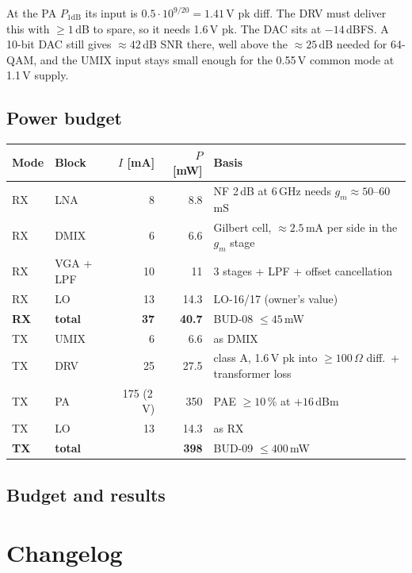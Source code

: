 \medskip
\noindent At the PA $P_\mathrm{1dB}$ its input is $0.5 \cdot 10^{9/20} = 1.41$\,V pk diff.
The DRV must deliver this with $\geq 1$\,dB to spare, so it needs 1.6\,V pk. The DAC sits
at $-14$\,dBFS. A 10-bit DAC still gives $\approx 42$\,dB SNR there, well above the
$\approx 25$\,dB needed for 64-QAM, and the UMIX input stays small enough for the
0.55\,V common mode at 1.1\,V supply.

\subsection{Power budget}

\par\medskip\noindent\small
\begin{tabularx}{\textwidth}{@{}l l r r L@{}}
	\toprule
	\textbf{Mode} & \textbf{Block} & \textbf{$I$ [mA]} & \textbf{$P$ [mW]} & \textbf{Basis} \\
	\midrule
	RX & LNA & 8 & 8.8 & NF 2\,dB at 6\,GHz needs $g_m \approx 50$--60\,mS \\
	RX & DMIX & 6 & 6.6 & Gilbert cell, $\approx 2.5$\,mA per side in the $g_m$ stage \\
	RX & VGA + LPF & 10 & 11 & 3 stages + LPF + offset cancellation \\
	RX & LO & 13 & 14.3 & LO-16/17 (owner's value) \\
	\textbf{RX} & \textbf{total} & \textbf{37} & \textbf{40.7} & BUD-08 $\leq 45$\,mW \\
	\midrule
	TX & UMIX & 6 & 6.6 & as DMIX \\
	TX & DRV & 25 & 27.5 & class A, 1.6\,V pk into $\geq 100\,\Omega$ diff.\ + transformer loss \\
	TX & PA & 175 (2\,V) & 350 & PAE $\geq 10$\,\% at $+16$\,dBm \\
	TX & LO & 13 & 14.3 & as RX \\
	\textbf{TX} & \textbf{total} & & \textbf{398} & BUD-09 $\leq 400$\,mW \\
	\bottomrule
\end{tabularx}\par\normalsize

\subsection{Budget and results}

\section{Changelog}

